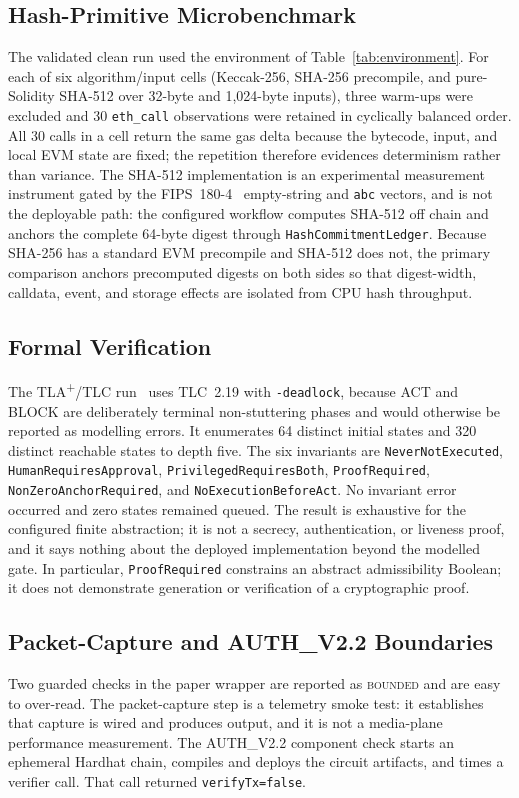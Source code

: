 \documentclass[journal]{IEEEtran}
\newif\ifshowrevisions
\newcommand{\rev}[1]{{\ifshowrevisions\color{blue}\else\color{black}\fi #1}}
\newcommand{\Ebounded}{\textsc{bounded}}
\begin{document}
\subsection{Hash-Primitive Microbenchmark}
\label{sec:hash-detail}
The validated clean run used the environment of
Table~\ref{tab:environment}. For each of six algorithm/input cells
(Keccak-256, SHA-256 precompile, and pure-Solidity SHA-512 over 32-byte and
1{,}024-byte inputs), three warm-ups were excluded and 30 \texttt{eth\_call}
observations were retained in cyclically balanced order. All 30 calls in a
cell return the same gas delta because the bytecode, input, and local EVM
state are fixed; the repetition therefore evidences determinism rather than
variance. The SHA-512 implementation is an experimental measurement instrument
gated by the FIPS~180-4~\rev{\cite{fips}} empty-string and \texttt{abc} vectors, and is not the
deployable path: the \rev{configured} workflow computes SHA-512 off chain and
anchors the complete 64-byte digest through \texttt{HashCommitmentLedger}.
Because SHA-256 has a standard EVM precompile and SHA-512 does not, the
primary comparison anchors precomputed digests on both sides so that
digest-width, calldata, event, and storage effects are isolated from CPU hash
throughput.

\subsection{Formal Verification}
\label{sec:formal-detail}
The TLA\textsuperscript{+}/TLC run~\rev{\cite{tla}} uses TLC~2.19 with \texttt{-deadlock},
because ACT and BLOCK are deliberately terminal non-stuttering phases and
would otherwise be reported as modelling errors. It enumerates 64 distinct
initial states and 320 distinct reachable states to depth five. The six
invariants are \texttt{NeverNotExecuted}, \texttt{HumanRequiresApproval},
\texttt{PrivilegedRequiresBoth}, \texttt{ProofRequired},
\texttt{NonZeroAnchorRequired}, and \texttt{NoExecutionBeforeAct}. No
invariant error occurred and zero states remained queued. The result is
exhaustive for the configured finite abstraction; it is not a secrecy,
authentication, or liveness proof, and it says nothing about the deployed
implementation beyond the modelled gate. In particular,
\texttt{ProofRequired} constrains an abstract admissibility Boolean; it does
not demonstrate generation or verification of a cryptographic proof.

\subsection{Packet-Capture and AUTH\_V2.2 Boundaries}
\label{sec:auth-detail}
Two guarded checks in the paper wrapper are reported as \Ebounded{} and are
easy to over-read. The packet-capture step is a telemetry smoke test: it
establishes that capture is wired and produces output, and it is not a
media-plane performance measurement. The AUTH\_V2.2 component check starts an
ephemeral Hardhat chain, compiles and deploys the circuit artifacts, and times
a verifier call. That call returned \texttt{verifyTx=false}.
\end{document}
